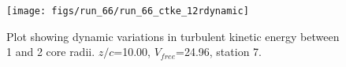 \begin{figure}[H]
\centering
\texttt{[image: figs/run\_66/run\_66\_ctke\_12rdynamic]}
\caption{Plot showing dynamic variations in turbulent kinetic energy between 1 and 2 core radii. $z/c$=10.00, $V_{free}$=24.96, station 7.}
\label{fig:run_66_ctke_12rdynamic}
\end{figure}


